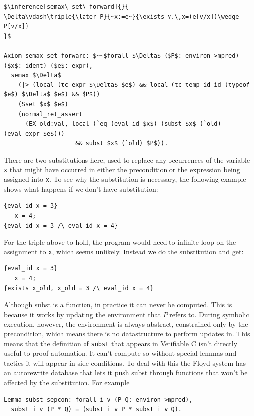 \documentclass{puthesis}
\begin{document}
\begin{lstlisting}
$\inference[semax\_set\_forward]{}{
\Delta\vdash\triple{\later P}{~x:=e~}{\exists v.\,x=(e[v/x])\wedge P[v/x]}
}$

Axiom semax_set_forward: $~~$forall $\Delta$ ($P$: environ->mpred) ($x$: ident) ($e$: expr),
  semax $\Delta$
    (|> (local (tc_expr $\Delta$ $e$) && local (tc_temp_id id (typeof $e$) $\Delta$ $e$) && $P$))
    (Sset $x$ $e$) 
    (normal_ret_assert 
      (EX old:val, local (`eq (eval_id $x$) (subst $x$ (`old) (eval_expr $e$)))
                    && subst $x$ (`old) $P$)).
\end{lstlisting}

There are two substitutions here, used to replace any occurrences of
the variable \lstinline|x| that might have occurred in either the
precondition or the expression being assigned into \lstinline|x|. To
see why the substitution is necessary, the following example shows
what happens if we don't have substitution:

\begin{lstlisting}
{eval_id x = 3}
   x = 4;
{eval_id x = 3 /\ eval_id x = 4}
\end{lstlisting}

For the triple above to hold, the program would need to infinite loop
on the assignment to \lstinline|x|, which seems unlikely. Instead we
do the substitution and get:

\begin{lstlisting}
{eval_id x = 3}
   x = 4;
{exists x_old, x_old = 3 /\ eval_id x = 4}
\end{lstlisting}


Although subst is a function, in practice it can never be computed.
This is because it works by updating the environment that $P$ refers
to. During symbolic execution, however, the environment is always
abstract, constrained only by the precondition, which means there is
no datastructure to perform updates in. This means that the definition of
\lstinline|subst| that appears in Verifiable C isn't directly useful
to proof automation. It can't compute so without special lemmas and
tactics it will appear in side conditions. To deal with this the Floyd
system has an autorewrite database that lets it push subst through
functions that won't be affected by the substitution. For example

\begin{lstlisting}
Lemma subst_sepcon: forall i v (P Q: environ->mpred),
  subst i v (P * Q) = (subst i v P * subst i v Q).
\end{lstlisting}
\end{document}
